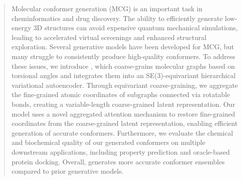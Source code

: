 \begin{abstract}
\normalsize
\noindent Molecular conformer generation (MCG) is an important task in cheminformatics and drug discovery. 
The ability to efficiently generate low-energy 3D structures can avoid expensive quantum mechanical simulations, leading to accelerated virtual screenings and enhanced structural exploration.
Several generative models have been developed for MCG, but many struggle to consistently produce high-quality conformers.
To address these issues, we introduce \modelns, which coarse-grains molecular graphs based on torsional angles and integrates them into an SE(3)-equivariant hierarchical variational autoencoder.
Through equivariant coarse-graining, we aggregate the fine-grained atomic coordinates of subgraphs connected via rotatable bonds, creating a variable-length coarse-grained latent representation.
Our model uses a novel aggregated attention mechanism to restore fine-grained coordinates from the coarse-grained latent representation, enabling efficient generation of accurate conformers.
Furthermore, we evaluate the chemical and biochemical quality of our generated conformers on multiple downstream applications, including property prediction and oracle-based protein docking.
Overall, \model generates more accurate conformer ensembles compared to prior generative models.            %
\end{abstract}

